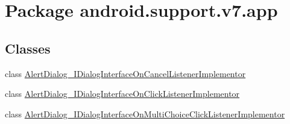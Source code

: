 \hypertarget{namespaceandroid_1_1support_1_1v7_1_1app}{
\section{Package android.support.v7.app}
\label{namespaceandroid_1_1support_1_1v7_1_1app}
}
\subsection*{Classes}
\begin{CompactItemize}
\item 
class \hyperlink{classandroid_1_1support_1_1v7_1_1app_1_1_alert_dialog___i_dialog_interface_on_cancel_listener_implementor}{AlertDialog\_\-IDialogInterfaceOnCancelListenerImplementor}
\item 
class \hyperlink{classandroid_1_1support_1_1v7_1_1app_1_1_alert_dialog___i_dialog_interface_on_click_listener_implementor}{AlertDialog\_\-IDialogInterfaceOnClickListenerImplementor}
\item 
class \hyperlink{classandroid_1_1support_1_1v7_1_1app_1_1_alert_dialog___i_dialog_interface_on_multi_choice_click_listener_implementor}{AlertDialog\_\-IDialogInterfaceOnMultiChoiceClickListenerImplementor}
\end{CompactItemize}
